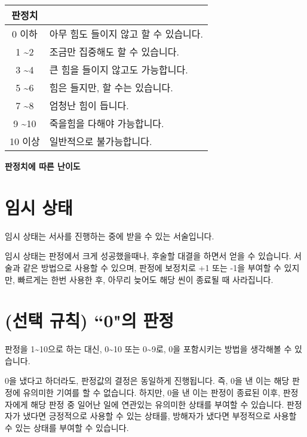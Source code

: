 \documentclass{report}
\begin{document}
	\begin{minipage}{\textwidth}
		\begin{tabularx}{\textwidth}{c|X}
			\hline
			\textbf{판정치} & \makecell{\centering\textbf{난이도}} \\ \hline \hline
			0 이하 & 아무 힘도 들이지 않고 할 수 있습니다. \\ \hline
			1 \textasciitilde 2 & 조금만 집중해도 할 수 있습니다. \\ \hline
			3 \textasciitilde 4 & 큰 힘을 들이지 않고도 가능합니다. \\ \hline
			5 \textasciitilde 6 & 힘은 들지만, 할 수는 있습니다. \\ \hline
			7 \textasciitilde 8 & 엄청난 힘이 듭니다. \\ \hline
			9 \textasciitilde 10 & 죽을힘을 다해야 가능합니다. \\ \hline
			10 이상 & 일반적으로 불가능합니다. \\ \hline
		\end{tabularx}
		
		\smallskip
		
		\begin{tightcenter}
			\textbf{판정치에 따른 난이도}
		\end{tightcenter}
	\end{minipage}
	
	\section*{임시 상태}
	임시 상태는 서사를 진행하는 중에 받을 수 있는 서술입니다.
	
	임시 상태는 판정에서 크게 성공했을때나, 후술할 대결을 하면서 얻을 수 있습니다. 서술과 같은 방법으로 사용할 수 있으며, 판정에 보정치로 +1 또는 -1을 부여할 수 있지만, 빠르게는 한번 사용한 후, 아무리 늦어도 해당 씬이 종료될 때 사라집니다.
	
	\section*{(선택 규칙) ``0"의 판정}
	판정을 1\textasciitilde10으로 하는 대신, 0\textasciitilde10 또는 0\textasciitilde9로, 0을 포함시키는 방법을 생각해볼 수 있습니다.
	
	0을 냈다고 하더라도, 판정값의 결정은 동일하게 진행됩니다. 즉, 0을 낸 이는 해당 판정에 유의미한 기여를 할 수 없습니다. 하지만, 0을 낸 이는 판정이 종료된 이후, 판정자에게 해당 판정 중 일어난 일에 연관있는 유의미한 상태를 부여할 수 있습니다. 판정자가 냈다면 긍정적으로 사용할 수 있는 상태를, 방해자가 냈다면 부정적으로 사용할 수 있는 상태를 부여할 수 있습니다.
	
\end{document}
